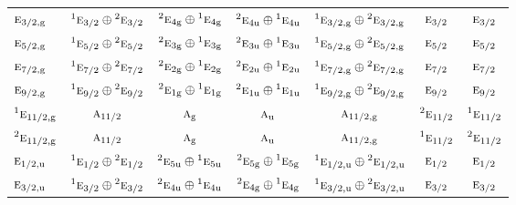 \documentclass[10pt,a4paper]{article}
\numberwithin{equation}{section}
\newcommand{\irr}[1]{\text{\normalfont\scshape #1}}
\newcommand{\conjpair}[1]{{}^{#1}}
\newcommand{\ptag}[1]{\mathrm{#1}}
\begin{document}
{\begin{longtable}{@{}lcccccc@{}}
$\irr{e}_{3/2,\ptag{g}}$ & $\conjpair{1}\irr{e}_{3/2}\oplus \conjpair{2}\irr{e}_{3/2}$ & $\conjpair{2}\irr{e}_{4\ptag{g}}\oplus \conjpair{1}\irr{e}_{4\ptag{g}}$ & $\conjpair{2}\irr{e}_{4\ptag{u}}\oplus \conjpair{1}\irr{e}_{4\ptag{u}}$ & $\conjpair{1}\irr{e}_{3/2,\ptag{g}}\oplus \conjpair{2}\irr{e}_{3/2,\ptag{g}}$ & $\irr{e}_{3/2}$ & $\irr{e}_{3/2}$\\
$\irr{e}_{5/2,\ptag{g}}$ & $\conjpair{1}\irr{e}_{5/2}\oplus \conjpair{2}\irr{e}_{5/2}$ & $\conjpair{2}\irr{e}_{3\ptag{g}}\oplus \conjpair{1}\irr{e}_{3\ptag{g}}$ & $\conjpair{2}\irr{e}_{3\ptag{u}}\oplus \conjpair{1}\irr{e}_{3\ptag{u}}$ & $\conjpair{1}\irr{e}_{5/2,\ptag{g}}\oplus \conjpair{2}\irr{e}_{5/2,\ptag{g}}$ & $\irr{e}_{5/2}$ & $\irr{e}_{5/2}$\\
$\irr{e}_{7/2,\ptag{g}}$ & $\conjpair{1}\irr{e}_{7/2}\oplus \conjpair{2}\irr{e}_{7/2}$ & $\conjpair{2}\irr{e}_{2\ptag{g}}\oplus \conjpair{1}\irr{e}_{2\ptag{g}}$ & $\conjpair{2}\irr{e}_{2\ptag{u}}\oplus \conjpair{1}\irr{e}_{2\ptag{u}}$ & $\conjpair{1}\irr{e}_{7/2,\ptag{g}}\oplus \conjpair{2}\irr{e}_{7/2,\ptag{g}}$ & $\irr{e}_{7/2}$ & $\irr{e}_{7/2}$\\
$\irr{e}_{9/2,\ptag{g}}$ & $\conjpair{1}\irr{e}_{9/2}\oplus \conjpair{2}\irr{e}_{9/2}$ & $\conjpair{2}\irr{e}_{1\ptag{g}}\oplus \conjpair{1}\irr{e}_{1\ptag{g}}$ & $\conjpair{2}\irr{e}_{1\ptag{u}}\oplus \conjpair{1}\irr{e}_{1\ptag{u}}$ & $\conjpair{1}\irr{e}_{9/2,\ptag{g}}\oplus \conjpair{2}\irr{e}_{9/2,\ptag{g}}$ & $\irr{e}_{9/2}$ & $\irr{e}_{9/2}$\\
$\conjpair{1}\irr{e}_{11/2,\ptag{g}}$ & $\irr{a}_{11/2}$ & $\irr{a}_{\ptag{g}}$ & $\irr{a}_{\ptag{u}}$ & $\irr{a}_{11/2,\ptag{g}}$ & $\conjpair{2}\irr{e}_{11/2}$ & $\conjpair{1}\irr{e}_{11/2}$\\
$\conjpair{2}\irr{e}_{11/2,\ptag{g}}$ & $\irr{a}_{11/2}$ & $\irr{a}_{\ptag{g}}$ & $\irr{a}_{\ptag{u}}$ & $\irr{a}_{11/2,\ptag{g}}$ & $\conjpair{1}\irr{e}_{11/2}$ & $\conjpair{2}\irr{e}_{11/2}$\\
$\irr{e}_{1/2,\ptag{u}}$ & $\conjpair{1}\irr{e}_{1/2}\oplus \conjpair{2}\irr{e}_{1/2}$ & $\conjpair{2}\irr{e}_{5\ptag{u}}\oplus \conjpair{1}\irr{e}_{5\ptag{u}}$ & $\conjpair{2}\irr{e}_{5\ptag{g}}\oplus \conjpair{1}\irr{e}_{5\ptag{g}}$ & $\conjpair{1}\irr{e}_{1/2,\ptag{u}}\oplus \conjpair{2}\irr{e}_{1/2,\ptag{u}}$ & $\irr{e}_{1/2}$ & $\irr{e}_{1/2}$\\
$\irr{e}_{3/2,\ptag{u}}$ & $\conjpair{1}\irr{e}_{3/2}\oplus \conjpair{2}\irr{e}_{3/2}$ & $\conjpair{2}\irr{e}_{4\ptag{u}}\oplus \conjpair{1}\irr{e}_{4\ptag{u}}$ & $\conjpair{2}\irr{e}_{4\ptag{g}}\oplus \conjpair{1}\irr{e}_{4\ptag{g}}$ & $\conjpair{1}\irr{e}_{3/2,\ptag{u}}\oplus \conjpair{2}\irr{e}_{3/2,\ptag{u}}$ & $\irr{e}_{3/2}$ & $\irr{e}_{3/2}$\\

\end{longtable}}
\end{document}
